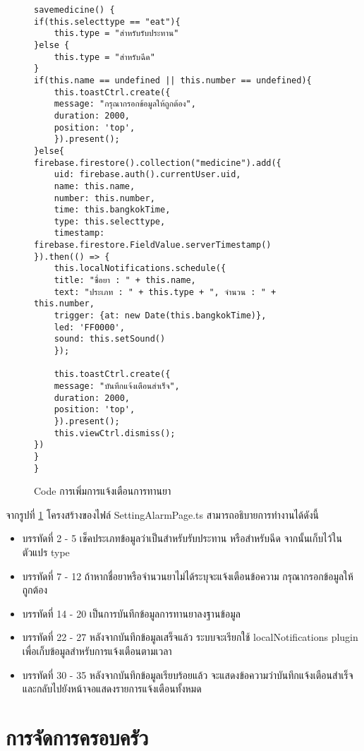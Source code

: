 \begin{figure}[H]
{\lstset{language=Pascal}
\begin{lstlisting}
savemedicine() {
if(this.selecttype == "eat"){
	this.type = "สำหรับรับประทาน"
}else {
	this.type = "สำหรับฉีด"
}
if(this.name == undefined || this.number == undefined){
	this.toastCtrl.create({
	message: "กรุณากรอกข้อมูลให้ถูกต้อง",
	duration: 2000,
	position: 'top',
	}).present();
}else{
firebase.firestore().collection("medicine").add({
	uid: firebase.auth().currentUser.uid,
	name: this.name,
	number: this.number,
	time: this.bangkokTime,
	type: this.selecttype,
	timestamp: firebase.firestore.FieldValue.serverTimestamp()
}).then(() => {
	this.localNotifications.schedule({
	title: "ชื่อยา : " + this.name,
	text: "ประเภท : " + this.type + ", จำนวน : " + this.number,
	trigger: {at: new Date(this.bangkokTime)},
	led: 'FF0000',
	sound: this.setSound()
	});

	this.toastCtrl.create({
	message: "บันทึกแจ้งเตือนสำเร็จ",
	duration: 2000,
	position: 'top',
	}).present();
	this.viewCtrl.dismiss();
})
}
}
\end{lstlisting}}
\caption{Code การเพิ่มการแจ้งเตือนการทานยา}
\label{Fig:4-alarm}
\end{figure}
\newpage

จากรูปที่ \ref{Fig:4-alarm} โครงสร้างของไฟล์ SettingAlarmPage.ts สามารถอธิบายการทำงานได้ดังนี้
\begin{itemize}[label={--}]
\item บรรทัดที่ 2 - 5 เช็คประเภทข้อมูลว่าเป็นสำหรับรับประทาน หรือสำหรับฉีด จากนั้นเก็บไว้ในตัวแปร type
\item บรรทัดที่ 7 - 12 ถ้าหากชื่อยาหรือจำนวนยาไม่ได้ระบุจะแจ้งเตือนข้อความ กรุณากรอกข้อมูลให้ถูกต้อง
\item บรรทัดที่ 14 - 20 เป็นการบันทึกข้อมูลการทานยาลงฐานข้อมูล
\item บรรทัดที่ 22 - 27 หลังจากบันทึกข้อมูลเสร็จแล้ว ระบบจะเรียกใช้ localNotifications plugin เพื่อเก็บข้อมูลสำหรับการแจ้งเตือนตามเวลา
\item บรรทัดที่ 30 - 35 หลังจากบันทึกข้อมูลเรียบร้อยแล้ว จะแสดงข้อความว่าบันทึกแจ้งเตือนสำเร็จ และกลับไปยังหน้าจอแสดงรายการแจ้งเตือนทั้งหมด
\end{itemize}
\newpage



\section{การจัดการครอบครัว}

